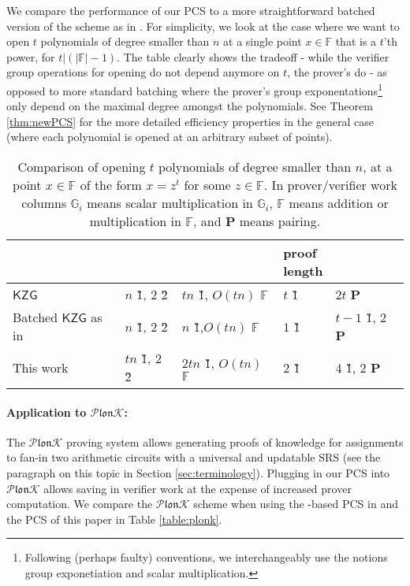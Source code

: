 \documentclass[11pt]{article} %
\newcommand{\Gi}{\ensuremath{{\mathbb G}_i}\xspace}
\newcommand{\F}{\ensuremath{\mathbb F}\xspace}
\newcommand{\kate}{\ensuremath{\mathsf{KZG}}\xspace}
\newcommand{\plonk}{\ensuremath{\mathcal{P} \mathfrak{lon}\mathcal{K}}\xspace}
\newcommand{\prg}[1]{ \paragraph{\textbf{#1}}}
\begin{document}
We compare the performance of our PCS to a more straightforward batched version of the \cite{kate} scheme as in \cite{plonk}.
For simplicity, we look at the case where we want to open $t$ polynomials of degree smaller than $n$ at a single point $x\in \F$ that is a $t$'th power, for $t|(|\F|-1)$. The table clearly shows the tradeoff - while the verifier group operations for opening do not depend anymore on $t$, the prover's do - as opposed to more standard batching where the prover's group exponentations\footnote{Following (perhaps faulty) conventions, we interchangeably use the notions group exponetiation and scalar multiplication.} only depend on the maximal degree amongst the polynomials.
See Theorem \ref{thm:newPCS} for the more detailed efficiency properties in the general case (where each polynomial is opened at an arbitrary subset of points).
\begin{table}[!htbp]
	\caption{Comparison of opening $t$ polynomials of degree smaller than $n$, at a  point $x\in \F$ of the form $x=z^t$ for some $z\in \F$. In prover/verifier work columns \Gi means scalar multiplication in \Gi, \F means addition or multiplication in \F, and \textbf{P} means pairing. }
	\centering
\begin{adjustbox}{width=1\textwidth}
	\begin{tabular}{l|l|l|l|l}
	& \thead{SRS size} & \thead{prover work} & \thead{proof\\ length} & \thead{verifier group operations} \\ \hline
		\kate 
		         & $n$ \G1, $2$ \G2  & $t n$ \G1, $O(t n)$ \F&   $t$ \G1 &   $2t$ \textbf{P}\\ \hline
		Batched \kate as in \cite{sonic,marlin,plonk}     & $n$ \G1, $2$ \G2 &   $n$ \G1,$O(t n)$ \F  & $1$ \G1 & $t-1$ \G1, $2$ \textbf{P}   \\ \hline
	This work     & $t n$ \G1, $2$ \G2 &   $2tn$ \G1, $O(t n)$ \F& 2 \G1 &  $4$ \G1, $2$ \textbf{P}   \\ \hline

	\end{tabular}
\end{adjustbox}
\label{table:prover-work}
\end{table}



\prg{Application to \plonk:}


The \plonk proving system \cite{plonk}  allows generating proofs of knowledge for assignments
to fan-in two arithmetic circuits with a universal and updatable SRS (see the paragraph on this topic in Section \ref{sec:terminology}).  Plugging in our PCS into \plonk allows saving in verifier work at the expense of increased prover computation.
We compare the \plonk scheme when using the  \cite{kate}-based PCS in \cite{plonk} and the PCS of this paper in Table \ref{table:plonk}. 
\end{document}
